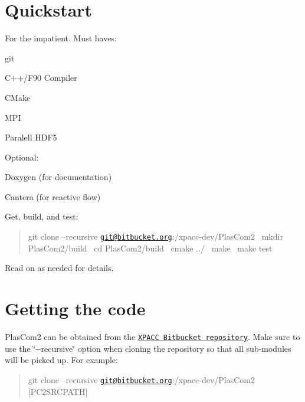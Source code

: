 \hypertarget{getting_started_quickstart}{}\section{Quickstart}\label{getting_started_quickstart}
For the impatient. Must haves\+:~\newline

\begin{DoxyItemize}
\item git
\item C++/\+F90 Compiler
\item C\+Make
\item M\+PI
\item Paralell H\+D\+F5
\end{DoxyItemize}

Optional\+:~\newline

\begin{DoxyItemize}
\item Doxygen (for documentation)
\item Cantera (for reactive flow)
\end{DoxyItemize}

Get, build, and test\+:~\newline
 \begin{quote}
git clone --recursive \href{mailto:git@bitbucket.org}{\tt git@bitbucket.\+org}\+:/xpacc-\/dev/\+Plas\+Com2~\newline
mkdir Plas\+Com2/build~\newline
cd Plas\+Com2/build~\newline
cmake ../~\newline
make~\newline
make test~\newline
\end{quote}


Read on as needed for details.\hypertarget{getting_started_obtain}{}\section{Getting the code}\label{getting_started_obtain}
Plas\+Com2 can be obtained from the \href{https://bitbucket.org:/xpacc-dev/PlasCom2}{\tt X\+P\+A\+CC Bitbucket repository}. Make sure to use the \char`\"{}-\/-\/recursive\char`\"{} option when cloning the repository so that all sub-\/modules will be picked up. For example\+:~\newline
 \begin{quote}
git clone --recursive \href{mailto:git@bitbucket.org}{\tt git@bitbucket.\+org}\+:/xpacc-\/dev/\+Plas\+Com2 \mbox{[}P\+C2\+S\+R\+C\+P\+A\+TH\mbox{]}~\newline
\end{quote}


